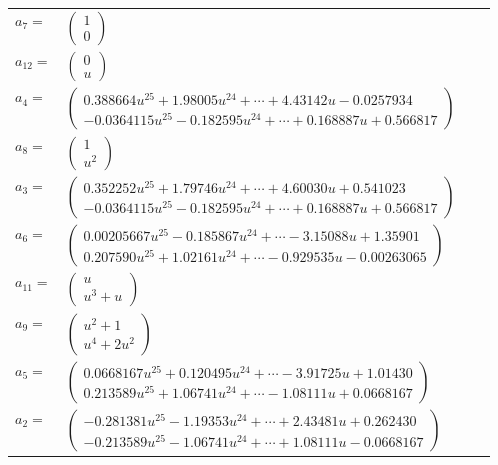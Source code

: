 \documentclass[1p]{elsarticle_modified}
\theoremstyle{definition}
\begin{document}
\begin{tabular}{m{7pt} m{180pt} m{7pt} m{180pt} }
\flushright $a_{7}=$&$\begin{pmatrix}1\\0\end{pmatrix}$ \\
\flushright $a_{12}=$&$\begin{pmatrix}0\\u\end{pmatrix}$ \\
\flushright $a_{4}=$&$\begin{pmatrix}0.388664 u^{25}+1.98005 u^{24}+\cdots+4.43142 u-0.0257934\\-0.0364115 u^{25}-0.182595 u^{24}+\cdots+0.168887 u+0.566817\end{pmatrix}$ \\
\flushright $a_{8}=$&$\begin{pmatrix}1\\u^2\end{pmatrix}$ \\
\flushright $a_{3}=$&$\begin{pmatrix}0.352252 u^{25}+1.79746 u^{24}+\cdots+4.60030 u+0.541023\\-0.0364115 u^{25}-0.182595 u^{24}+\cdots+0.168887 u+0.566817\end{pmatrix}$ \\
\flushright $a_{6}=$&$\begin{pmatrix}0.00205667 u^{25}-0.185867 u^{24}+\cdots-3.15088 u+1.35901\\0.207590 u^{25}+1.02161 u^{24}+\cdots-0.929535 u-0.00263065\end{pmatrix}$ \\
\flushright $a_{11}=$&$\begin{pmatrix}u\\u^3+u\end{pmatrix}$ \\
\flushright $a_{9}=$&$\begin{pmatrix}u^2+1\\u^4+2 u^2\end{pmatrix}$ \\
\flushright $a_{5}=$&$\begin{pmatrix}0.0668167 u^{25}+0.120495 u^{24}+\cdots-3.91725 u+1.01430\\0.213589 u^{25}+1.06741 u^{24}+\cdots-1.08111 u+0.0668167\end{pmatrix}$ \\
\flushright $a_{2}=$&$\begin{pmatrix}-0.281381 u^{25}-1.19353 u^{24}+\cdots+2.43481 u+0.262430\\-0.213589 u^{25}-1.06741 u^{24}+\cdots+1.08111 u-0.0668167\end{pmatrix}$ \\

\end{tabular}
\end{document}
